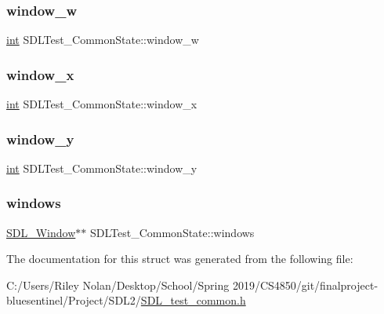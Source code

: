\mbox{\label{struct_s_d_l_test___common_state_adc94ae1febd2aa3fa4b190cd0f8cb546}} 
\subsubsection{\texorpdfstring{window\_w}{window\_w}}
{\footnotesize\ttfamily \mbox{\hyperlink{warnings_8h_a74f207b5aa4ba51c3a2ad59b219a423b}{int}} S\+D\+L\+Test\+\_\+\+Common\+State\+::window\+\_\+w}

\mbox{\label{struct_s_d_l_test___common_state_a5413ab562164642b3e6ee97ab5d938bf}} 
\subsubsection{\texorpdfstring{window\_x}{window\_x}}
{\footnotesize\ttfamily \mbox{\hyperlink{warnings_8h_a74f207b5aa4ba51c3a2ad59b219a423b}{int}} S\+D\+L\+Test\+\_\+\+Common\+State\+::window\+\_\+x}

\mbox{\label{struct_s_d_l_test___common_state_a1fcd61cbe37c2bb563e7b2f1c6853d29}} 
\subsubsection{\texorpdfstring{window\_y}{window\_y}}
{\footnotesize\ttfamily \mbox{\hyperlink{warnings_8h_a74f207b5aa4ba51c3a2ad59b219a423b}{int}} S\+D\+L\+Test\+\_\+\+Common\+State\+::window\+\_\+y}

\mbox{\label{struct_s_d_l_test___common_state_a0a054f0c45eb9d21f9561d701e721106}} 
\subsubsection{\texorpdfstring{windows}{windows}}
{\footnotesize\ttfamily \mbox{\hyperlink{_s_d_l__video_8h_a55a196c7d3b8497538632c79ae1e6392}{S\+D\+L\+\_\+\+Window}}$\ast$$\ast$ S\+D\+L\+Test\+\_\+\+Common\+State\+::windows}



The documentation for this struct was generated from the following file\+:\begin{DoxyCompactItemize}
\item 
C\+:/\+Users/\+Riley Nolan/\+Desktop/\+School/\+Spring 2019/\+C\+S4850/git/finalproject-\/bluesentinel/\+Project/\+S\+D\+L2/\mbox{\hyperlink{_s_d_l__test__common_8h}{S\+D\+L\+\_\+test\+\_\+common.\+h}}\end{DoxyCompactItemize}
